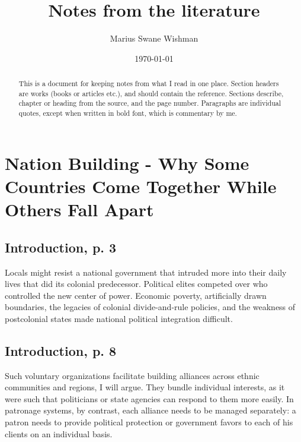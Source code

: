 \documentclass[12pt]{article}
\title{Notes from the literature}
\author[1]{Marius Swane Wishman}
\affil[1]{Department of Sociology and Political Science, NTNU}
\date{\today}
\begin{document}
\maketitle

\begin{abstract}

	This is a document for keeping notes from what I read in one place.
	Section headers are works (books or articles etc.), and should contain
	the reference. Sections describe, chapter or heading from the source,
	and the page number. Paragraphs are individual quotes, except when
	written in bold font, which is commentary by me.

\end{abstract}

\pagebreak

\tableofcontents

\pagebreak

\onehalfspacing
\section{Nation Building - Why Some Countries Come Together While Others Fall 
	Apart \citep{Wimmer_2018}}

\subsection{Introduction, p. 3}

Locals might resist a national government that intruded more into their daily
lives that did its colonial predecessor. Political elites competed over who
controlled the new center of power. Economic poverty, artificially drawn
boundaries, the legacies of colonial divide-and-rule policies, and the weakness
of postcolonial states made national political integration difficult.

\subsection{Introduction, p. 8}

Such voluntary organizations facilitate building alliances across ethnic
communities and regions, I will argue. They bundle individual interests, as it
were such that politicians or state agencies can respond to them more easily.
In patronage systems, by contrast, each alliance needs to be managed separately:
a patron needs to provide political protection or government favors to each of
his clients on an individual basis.
\end{document}
